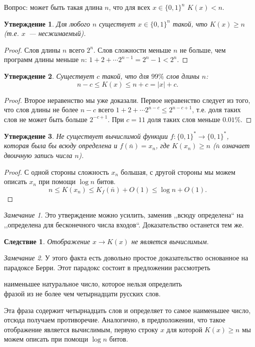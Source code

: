 \documentclass[12pt]{article}
\newcommand{\binstr}{\{0,1\}^*}
\theoremstyle{definition}
\theoremstyle{plain}
\newtheorem{statement}{Утверждение}[section]
\newtheorem{corollary}{Следствие}[section]
\theoremstyle{remark}
\newtheorem{remark}{Замечание}[section]
\begin{document}
Вопрос: может быть такая длина $n$, что для всех $x\in\{0,1\}^n$ $K(x) < n$.
\begin{statement}
    Для любого $n$ существует $x\in\{0,1\}^n$ такой, что $K(x)\ge n$ (т.е.
    $x$~--- несжимаемый).
\end{statement}
\begin{proof}
    Слов длины $n$ всего $2^n$. Слов сложности меньше $n$ не больше, чем
    программ длины меньше $n$:
    \(
    1+2+\dotsb 2^{n-1} = 2^n - 1 < 2^n.
    \)
\end{proof}
\begin{statement}
    Существует $c$ такой, что для $99\%$ слов длины $n$:
    \[
        n - c \le K(x) \le n + c = |x| + c.
    \]
\end{statement}
\begin{proof}
    Второе неравенство мы уже доказали. Первое неравенство следует из того, что
    слов длины не более $n - c$ всего $1+2+\dotsb 2^{n-c} \le 2^{n - c + 1}$,
    т.е. доля таких слов не может быть больше $2^{-c + 1}$.
    При $c = 11$ доля таких слов меньше $0.01\%$. 
\end{proof}
\begin{statement}
    Не существует вычислимой функции $f:\binstr\to\binstr$, которая была бы
    всюду определена и $f(\bar n) = x_n$, где $K(x_n)\ge n$ ($\bar n$ означает
    двоичную запись числа $n$).
\end{statement}
\begin{proof} С одной стороны сложность $x_n$ большая, с другой стороны мы
    можем описать $x_n$ при помощи $\log n$ битов.
    \[
        n\le K(x_n)\le K_f(\bar n) + O(1) \le \log n + O(1).
    \]
\end{proof}
\begin{remark}
    Это утверждение можно усилить, заменив ,,всюду определена`` на ,,определена
    для бесконечного числа входов``. Доказательство останется тем же.
\end{remark}
\begin{corollary}
    Отображение $x\to K(x)$ не является вычислимым.
\end{corollary}
\begin{remark}
    У этого факта есть довольно простое доказательство основанное на парадоксе Берри.
    Этот парадокс состоит в предложении рассмотреть 
    \begin{center}
        наименьшее натуральное число, которое нельзя определить\\ фразой
        из не более чем четырнадцати русских слов.
    \end{center}
    Эта фраза содержит четырнадцать слов и определяет то самое наименьшее число,
    отсюда получаем противоречие. Аналогично, в предположении, что такое отображение
    является вычислимым, первую строку $x$ для которой $K(x)\ge n$ мы можем описать
    при помощи $\log n$ битов.
\end{remark}
\end{document}
